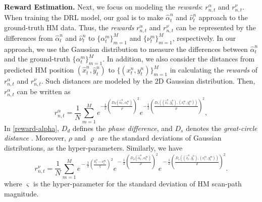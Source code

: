 \documentclass[10pt,journal,compsoc]{IEEEtran}
\begin{document}
\textbf{Reward Estimation.}
Next, we focus on modeling the \textit{rewards}: $r^{\alpha}_{n,t}$ and $r^{\nu}_{n,t}$.
When training the DRL model, our goal is to make $\hat{\alpha}^n_{t}$ and $\hat{\nu}^n_{t}$ approach to the ground-truth HM data.
Thus, the  \textit{rewards} $r^{\alpha}_{n,t}$ and $r^{\nu}_{n,t}$ can be represented by the differences from $\hat{\alpha}^n_{t}$ and $\hat{\nu}^n_{t}$ to $\{{\alpha}^m_{t}\}_{m=1}^M$ and $\{{\nu}^m_{t}\}_{m=1}^M$, respectively.
In our approach, we use the Gaussian distribution to measure the differences between $\hat{\alpha}^n_{t}$ and the ground-truth $\{\alpha^{m}_{t}\}_{m=1}^M$. In addition, we also consider the distances from predicted HM position $(\hat{x}^n_t,\hat{y}^n_t)$ to $\{(x^{n}_{t},y^{n}_{t})\}_{m=1}^M$ in calculating the \textit{rewards} of $r^{\alpha}_{n,t}$ and $r^{\nu}_{n,t}$. Such distances are modeled by the 2D Gaussian distribution.
Then, $r^{\alpha}_{n,t}$ can be written as
\begin{equation}
\label{reward-alpha}
r^{\alpha}_{n,t} = \frac{1}{N}\sum_{m=1}^{M} e^{-\frac{1}{2}\left(\frac{D_d(\hat{\alpha}^n_{t}, \alpha^m_{t})}{\rho}\right)^2} e^{-\frac{1}{2}\left(\frac{D_s((\hat{x}^n_{t},\hat{y}^n_{t}),(x^m_{t},y^m_{t}))}{\varrho}\right)^2},
\end{equation}
In \eqref{reward-alpha}, $D_d$ defines the \textit{phase difference}, and $D_s$ denotes the \textit{great-circle distance} \cite{shumaker1984astronomical}. Moreover, $\rho$ and $\varrho$ are the standard deviations of Gaussian distributions, as the hyper-parameters. Similarly, we have
\begin{equation}
\label{reward-nu}
r^{\nu}_{n,t} \!\!=\!\! \frac{1}{N}\!\sum_{m=1}^{M}\!
e^{\!-\frac{1}{2}\left(\!{\frac{\hat{\nu}^n_{t}-\nu^{m}_{t}}{\varsigma}}\!\right)^2} \! e^{\!-\frac{1}{2}\left(\!\frac{D_d(\hat{\alpha}^n_{t}, \alpha^m_{t})}{\rho}\!\right)^2} \!\!e^{\!-\frac{1}{2}\left(\!\frac{D_s((\hat{x}^n_{t},\hat{y}^n_{t}),(x^m_{t},y^m_{t}))}{\varrho}\!\right)^2}.
\end{equation}
where $\varsigma$ is the hyper-parameter for the standard deviation of HM scan-path magnitude.
\end{document}
